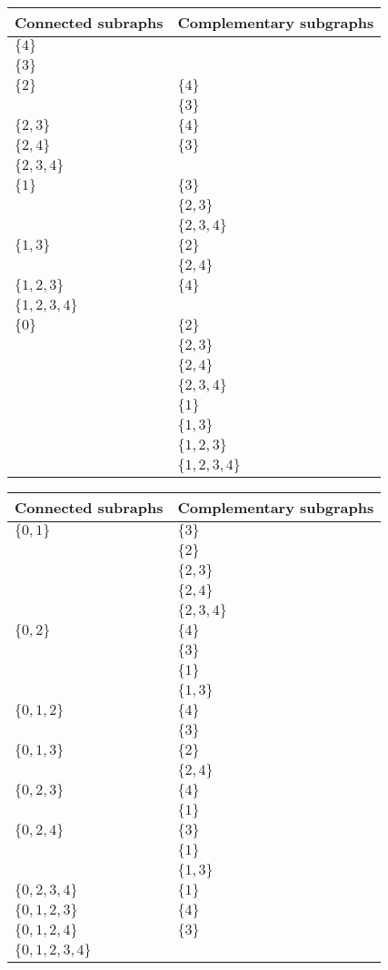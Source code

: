 \documentclass{scrartcl}
\begin{document}
\begin{table}[h]
\begin{tabular}{ll}
Connected subraphs & Complementary subgraphs \\ \hline\hline
$\{4\}$ & \\ \hline
$\{3\}$ & \\ \hline
$\{2\}$ & $\{4\}$ \\
& $\{3\}$ \\ \hline
$\{2, 3\}$ & $\{4\}$ \\ \hline
$\{2, 4\}$ & $\{3\}$ \\ \hline
$\{2, 3, 4\}$ & \\ \hline
$\{1\}$ & $\{3\}$ \\
& $\{2,3\}$ \\
& $\{2,3,4\}$ \\ \hline
$\{1, 3\}$ & $\{2\}$ \\
& $\{2,4\}$ \\ \hline
$\{1, 2, 3\}$ & $\{4\}$ \\ \hline
$\{1, 2, 3, 4\}$ \\ \hline
$\{0\}$ & $\{2\}$ \\
& $\{2, 3\}$ \\
& $\{2, 4\}$ \\
& $\{2, 3, 4\}$ \\
& $\{1\}$ \\
& $\{1, 3\}$ \\
& $\{1, 2, 3\}$ \\
& $\{1, 2, 3, 4\}$
\end{tabular}
\end{table}
\begin{table}[h]
\begin{tabular}{ll}
Connected subraphs & Complementary subgraphs \\ \hline\hline
$\{0, 1\}$ & $\{3\}$ \\
& $\{2\}$ \\
& $\{2, 3\}$ \\
& $\{2, 4\}$ \\
& $\{2, 3, 4\}$ \\ \hline
$\{0, 2\}$ & $\{4\}$ \\
& $\{3\}$ \\
& $\{1\}$ \\
& $\{1, 3\}$ \\ \hline
$\{0, 1, 2\}$ & $\{4\}$ \\
& $\{3\}$ \\ \hline
$\{0, 1, 3\}$ & $\{2\}$ \\
& $\{2, 4\}$ \\ \hline
$\{0, 2, 3\}$ & $\{4\}$ \\
& $\{1\}$ \\ \hline
$\{0, 2, 4\}$ & $\{3\}$ \\
& $\{1\}$ \\
& $\{1, 3\}$ \\ \hline
$\{0, 2, 3, 4\}$ & $\{1\}$ \\ \hline
$\{0, 1, 2, 3\}$ & $\{4\}$ \\ \hline
$\{0, 1, 2, 4\}$ & $\{3\}$ \\ \hline
$\{0, 1, 2, 3, 4\}$
\end{tabular}
\end{table}
\end{document}
